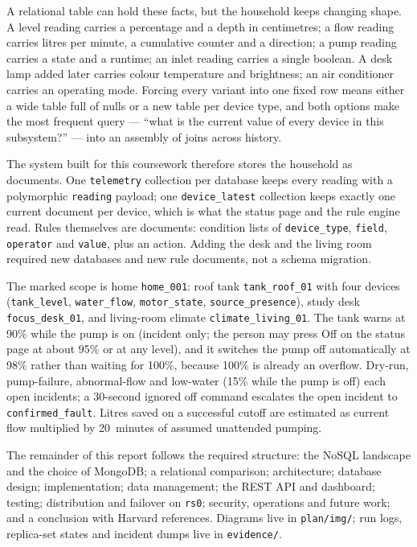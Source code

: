 \documentclass[11pt,a4paper]{article}
\begin{document}
A relational table can hold these facts, but the household keeps changing shape. A level reading carries a percentage and a depth in centimetres; a flow reading carries litres per minute, a cumulative counter and a direction; a pump reading carries a state and a runtime; an inlet reading carries a single boolean. A desk lamp added later carries colour temperature and brightness; an air conditioner carries an operating mode. Forcing every variant into one fixed row means either a wide table full of nulls or a new table per device type, and both options make the most frequent query --- ``what is the current value of every device in this subsystem?'' --- into an assembly of joins across history.

The system built for this coursework therefore stores the household as documents. One \texttt{telemetry} collection per database keeps every reading with a polymorphic \texttt{reading} payload; one \texttt{device\_latest} collection keeps exactly one current document per device, which is what the status page and the rule engine read. Rules themselves are documents: condition lists of \texttt{device\_type}, \texttt{field}, \texttt{operator} and \texttt{value}, plus an action. Adding the desk and the living room required new databases and new rule documents, not a schema migration.

The marked scope is home \texttt{home\_001}: roof tank \texttt{tank\_roof\_01} with four devices (\texttt{tank\_level}, \texttt{water\_flow}, \texttt{motor\_state}, \texttt{source\_presence}), study desk \texttt{focus\_desk\_01}, and living-room climate \texttt{climate\_living\_01}. The tank warns at 90\% while the pump is on (incident only; the person may press Off on the status page at about 95\% or at any level), and it switches the pump off automatically at 98\% rather than waiting for 100\%, because 100\% is already an overflow. Dry-run, pump-failure, abnormal-flow and low-water (15\% while the pump is off) each open incidents; a 30-second ignored off command escalates the open incident to \texttt{confirmed\_fault}. Litres saved on a successful cutoff are estimated as current flow multiplied by 20~minutes of assumed unattended pumping.

The remainder of this report follows the required structure: the NoSQL landscape and the choice of MongoDB; a relational comparison; architecture; database design; implementation; data management; the REST API and dashboard; testing; distribution and failover on \texttt{rs0}; security, operations and future work; and a conclusion with Harvard references. Diagrams live in \texttt{plan/img/}; run logs, replica-set states and incident dumps live in \texttt{evidence/}.
\end{document}
